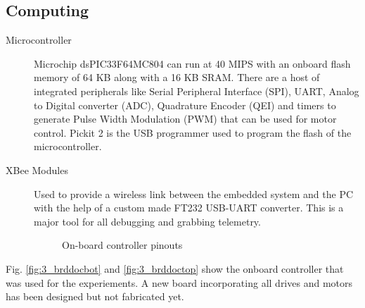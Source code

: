 \subsection*{Computing}
\begin{description}
  \item[\textsf{Microcontroller}]
  Microchip dsPIC33F64MC804 can run at 40 MIPS with an onboard flash memory of
  64 KB along with a 16 KB SRAM. There are a host of integrated peripherals like Serial Peripheral 
  Interface (SPI), UART, Analog to Digital converter (ADC), Quadrature Encoder (QEI) and timers to 
  generate Pulse Width Modulation (PWM) that can be used for motor control. Pickit 2 is the USB programmer 
  used to program the flash of the microcontroller.
  \item[\textsf{XBee Modules}]
  Used to provide a wireless link between the embedded system and the PC with the help of a custom made 
  FT232 USB-UART converter. This is a major tool for all debugging and grabbing telemetry.
  \begin{figure}[H]
  \centering
  \caption{On-board controller pinouts}
  \label{fig:brddoc}
  \end{figure}
\end{description}
Fig. \ref{fig:3_brddocbot} and \ref{fig:3_brddoctop} show the onboard controller that was used for the experiements. A new board incorporating all drives and motors has been designed but not fabricated yet.












